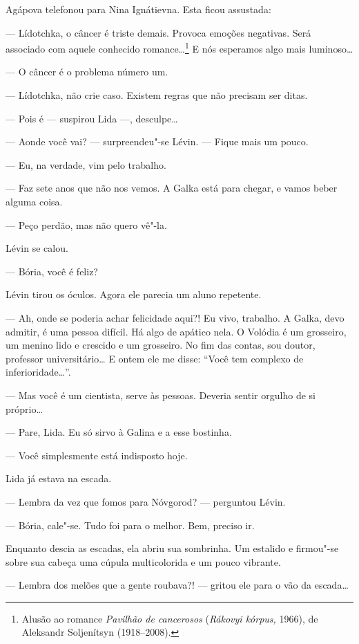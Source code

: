 Agápova telefonou para Nina Ignátievna. Esta ficou assustada:

--- Lídotchka, o câncer é triste demais. Provoca emoções negativas. Será
associado com aquele conhecido romance\ldots{}\footnote{Alusão ao romance
  \emph{Pavilhão de cancerosos} (\emph{Rákovyi kórpus,} 1966), de
  Aleksandr Soljenítsyn (1918--2008).} E nós esperamos algo mais
luminoso\ldots{}

--- O câncer é o problema número um.

--- Lídotchka, não crie caso. Existem regras que não precisam ser ditas.

--- Pois é --- suspirou Lida ---, desculpe\ldots{}

--- Aonde você vai? --- surpreendeu"-se Lévin. --- Fique mais um pouco.

--- Eu, na verdade, vim pelo trabalho.

--- Faz sete anos que não nos vemos. A Galka está para chegar, e vamos
beber alguma coisa.

--- Peço perdão, mas não quero vê"-la.

Lévin se calou.

--- Bória, você é feliz?

Lévin tirou os óculos. Agora ele parecia um aluno repetente.

--- Ah, onde se poderia achar felicidade aqui?! Eu vivo, trabalho. A
Galka, devo admitir, é uma pessoa difícil. Há algo de apático nela. O
Volódia é um grosseiro, um menino lido e crescido e um grosseiro. No fim
das contas, sou doutor, professor universitário\ldots{} E ontem ele me disse:
``Você tem complexo de inferioridade\ldots{}''.

--- Mas você é um cientista, serve às pessoas. Deveria sentir orgulho de
si próprio\ldots{}

--- Pare, Lida. Eu só sirvo à Galina e a esse bostinha.

--- Você simplesmente está indisposto hoje.

Lida já estava na escada.

--- Lembra da vez que fomos para Nóvgorod? --- perguntou Lévin.

--- Bória, cale"-se. Tudo foi para o melhor. Bem, preciso ir.

Enquanto descia as escadas, ela abriu sua sombrinha. Um estalido e
firmou"-se sobre sua cabeça uma cúpula multicolorida e um pouco vibrante.

--- Lembra dos melões que a gente roubava?! --- gritou ele para o vão da
escada\ldots{}

